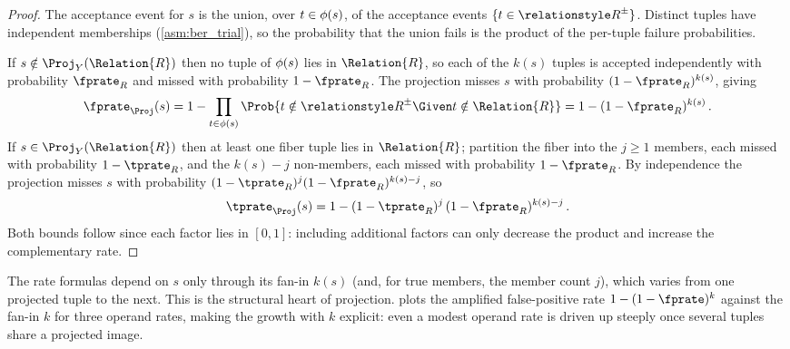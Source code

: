 \documentclass[ ../main.tex]{subfiles}
\begin{document}
\begin{proof}
The acceptance event for $s$ is the union, over $t \in \phi(s)$, of the
acceptance events $\{ t \in \ARelation{R} \}$. Distinct tuples have independent
memberships (\cref{asm:ber_trial}), so the probability that the union fails is the
product of the per-tuple failure probabilities.

If $s \notin \Proj_Y(\Relation{R})$ then no tuple of $\phi(s)$ lies in
$\Relation{R}$, so each of the $k(s)$ tuples is accepted independently with
probability $\fprate_R$ and missed with probability $1-\fprate_R$. The projection
misses $s$ with probability $(1-\fprate_R)^{k(s)}$, giving
\begin{equation}
    \fprate_\Proj(s)
    = 1 - \prod_{t \in \fiber(s)} \Prob{t \notin \ARelation{R} \Given t \notin \Relation{R}}
    = 1 - (1-\fprate_R)^{k(s)}\,.
\end{equation}
If $s \in \Proj_Y(\Relation{R})$ then at least one fiber tuple lies in
$\Relation{R}$; partition the fiber into the $j \geq 1$ members, each missed with
probability $1-\tprate_R$, and the $k(s)-j$ non-members, each missed with
probability $1-\fprate_R$. By independence the projection misses $s$ with
probability $(1-\tprate_R)^{j}(1-\fprate_R)^{k(s)-j}$, so
\begin{equation}
    \tprate_\Proj(s) = 1 - (1-\tprate_R)^{j}\,(1-\fprate_R)^{k(s)-j}\,.
\end{equation}
Both bounds follow since each factor lies in $[0,1]$: including additional
factors can only decrease the product and increase the complementary rate.
\end{proof}

The rate formulas depend on $s$ only through its fan-in $k(s)$ (and, for true
members, the member count $j$), which varies from one projected tuple to the next.
This is the structural heart of projection.  plots the
amplified false-positive rate $1-(1-\fprate)^{k}$ against the fan-in $k$ for three
operand rates, making the growth with $k$ explicit: even a modest operand rate is
driven up steeply once several tuples share a projected image.
\end{document}
